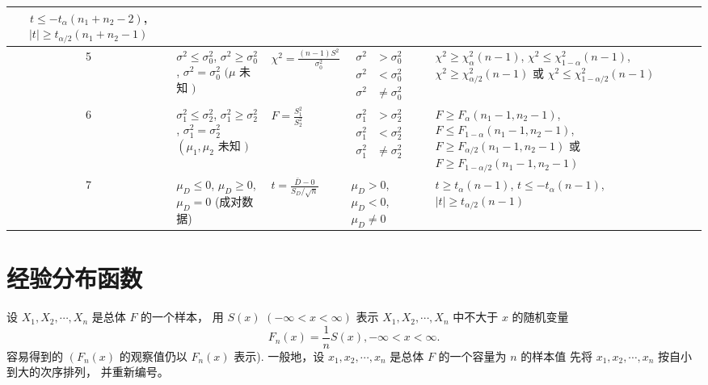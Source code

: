 \begin{table}[]
\begin{tabularx}{1\textwidth}{
         c
        | >{\raggedright\arraybackslash}X
        | >{\raggedright\arraybackslash}X 
        | >{\raggedright\arraybackslash}X 
        | >{\raggedright\arraybackslash}X }
    $ t \leq-t_{\alpha}\left(n_{1}+n_{2}-2\right) $,
    $ |t| \geq t_{\alpha / 2}\left(n_{1}+n_{2}-1\right) $ \\ \hline
    5 & $ \sigma^{2} \leq \sigma_{0}^{2} $,
    $ \sigma^{2} \geq \sigma_{0}^{2} $,
    $ \sigma^{2}=\sigma_{0}^{2} $
    $ (\mu $ 未知 $ ) $ & $ \chi^{2}=\frac{(n-1) S^{2}}{\sigma_{0}^{2}} $ & $ \begin{aligned} \sigma^{2} &>\sigma_{0}^{2} \\ \sigma^{2} &<\sigma_{0}^{2} \\ \sigma^{2} & \neq \sigma_{0}^{2} \end{aligned} $ & $ \chi^{2} \geq \chi_{\alpha}^{2}(n-1) $,
    $ \chi^{2} \leq \chi_{1-\alpha}^{2}(n-1) $,
    $ \chi^{2} \geq \chi_{\alpha / 2}^{2}(n-1) $ 或
    $ \chi^{2} \leq \chi_{1-\alpha / 2}^{2}(n-1) $ \\ \hline
    6 & $ \sigma_{1}^{2} \leq \sigma_{2}^{2} $,
    $ \sigma_{1}^{2} \geq \sigma_{2}^{2} $,
    $ \sigma_{1}^{2}=\sigma_{2}^{2} $
    $ \left(\mu_{1}, \mu_{2}\right. $ 未知 $ ) $ & $ F=\frac{S_{1}^{2}}{S_{2}^{2}} $ & $ \begin{aligned} \sigma_{1}^{2} &>\sigma_{2}^{2} \\ \sigma_{1}^{2} &<\sigma_{2}^{2} \\ \sigma_{1}^{2} & \neq \sigma_{2}^{2} \end{aligned} $ & $ F \geq F_{\alpha}\left(n_{1}-1, n_{2}-1\right) $,
    $ F \leq F_{1-\alpha}\left(n_{1}-1, n_{2}-1\right) $,
    $ F \geq F_{\alpha / 2}\left(n_{1}-1, n_{2}-1\right) $ 或
    $ F \geq F_{1-\alpha / 2}\left(n_{1}-1, n_{2}-1\right) $ \\ \hline
    7 & $ \mu_{D} \leq 0 $,
    $ \mu_{D} \geq 0 $,
    $ \mu_{D}=0 $
    (成对数据) & $ t=\frac{\bar{D}-0}{S_{D} / \sqrt{n}} $ & $ \mu_{D}>0 $,
    $ \mu_{D}<0 $,
    $ \mu_{D} \neq 0 $ &  $ t \geq t_{\alpha}(n-1) $,
    $ t \leq-t_{\alpha}(n-1) $,
    $ |t| \geq t_{\alpha / 2}(n-1) $\\ \hline
    
    \end{tabularx}
\end{table}

\section{经验分布函数}

设 $ X_{1}, X_{2}, \cdots, X_{n} $ 是总体 $ {F} $ 的一个样本， 用 $ S({x}) $
$ (-\infty<x<\infty) $ 表示 $ X_{1}, X_{2}, \cdots, X_{n} $ 中不大于 $ x $ 的随机变量
\begin{equation}
F_{n}(x)=\frac{1}{n} S(x),-\infty<x<\infty .
\end{equation}
容易得到的 $ \left({F}_{n}({x})\right. $ 的观察值仍以 $ {F}_{n}({x}) $ 表示). 
一般地，设 $ {x}_{1}, {x}_{2}, \cdots, {x}_{n} $ 是总体 $ {F} $ 的一个容量为 $ {n} $ 的样本值
先将 $ {x}_{1}, {x}_{2}, \cdots, {x}_{n} $ 按自小到大的次序排列， 并重新编号。 

